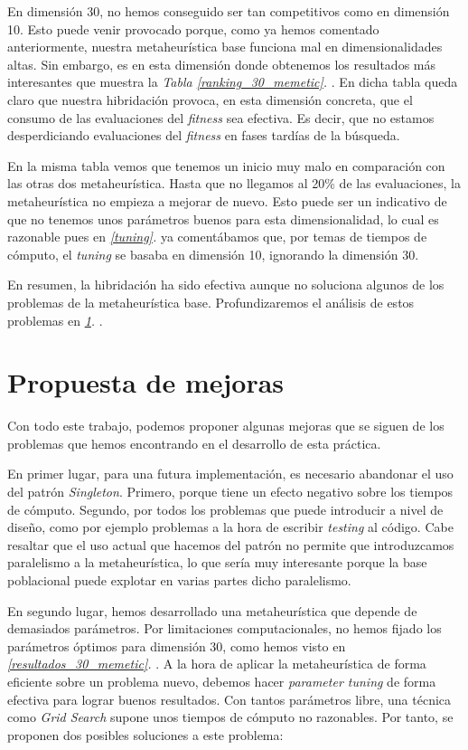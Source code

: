 \documentclass[11pt]{article}
\begin{document}
En dimensión 30, no hemos conseguido ser tan competitivos como en dimensión 10. Esto puede venir provocado porque, como ya hemos comentado anteriormente, nuestra metaheurística base funciona mal en dimensionalidades altas. Sin embargo, es en esta dimensión donde obtenemos los resultados más interesantes que muestra la \emph{Tabla \ref{ranking_30_memetic}. }. En dicha tabla queda claro que nuestra hibridación provoca, en esta dimensión concreta, que el consumo de las evaluaciones del \emph{fitness} sea efectiva. Es decir, que no estamos desperdiciando evaluaciones del \emph{fitness} en fases tardías de la búsqueda.

En la misma tabla vemos que tenemos un inicio muy malo en comparación con las otras dos metaheurística. Hasta que no llegamos al 20\% de las evaluaciones, la metaheurística no empieza a mejorar de nuevo. Esto puede ser un indicativo de que no tenemos unos parámetros buenos para esta dimensionalidad, lo cual es razonable pues en \emph{\ref{tuning}. } ya comentábamos que, por temas de tiempos de cómputo, el \emph{tuning} se basaba en dimensión 10, ignorando la dimensión 30.

En resumen, la hibridación ha sido efectiva aunque no soluciona algunos de los problemas de la metaheurística base. Profundizaremos el análisis de estos problemas en \emph{\ref{mejoras}. }.

\pagebreak
\section{Propuesta de mejoras} \label{mejoras}

Con todo este trabajo, podemos proponer algunas mejoras que se siguen de los problemas que hemos encontrando en el desarrollo de esta práctica.

En primer lugar, para una futura implementación, es necesario abandonar el uso del patrón \emph{Singleton}. Primero, porque tiene un efecto negativo sobre los tiempos de cómputo. Segundo, por todos los problemas que puede introducir a nivel de diseño, como por ejemplo problemas a la hora de escribir \emph{testing} al código. Cabe resaltar que el uso actual que hacemos del patrón no permite que introduzcamos paralelismo a la metaheurística, lo que sería muy interesante porque la base poblacional puede explotar en varias partes dicho paralelismo.

En segundo lugar, hemos desarrollado una metaheurística que depende de demasiados parámetros. Por limitaciones computacionales, no hemos fijado los parámetros óptimos para dimensión 30, como hemos visto en \emph{\ref{resultados_30_memetic}. }. A la hora de aplicar la metaheurística de forma eficiente sobre un problema nuevo, debemos hacer \emph{parameter tuning} de forma efectiva para lograr buenos resultados. Con tantos parámetros libre, una técnica como \emph{Grid Search} supone unos tiempos de cómputo no razonables. Por tanto, se proponen dos posibles soluciones a este problema:
\end{document}
